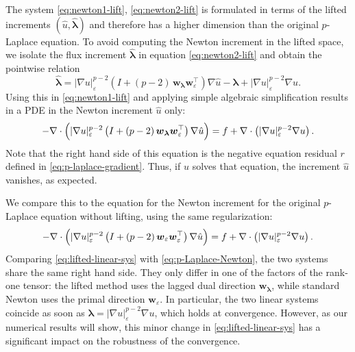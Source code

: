 \documentclass[11pt,pdflatex,sn-mathphys-num]{sn-jnl}
\theoremstyle{thmstyleone}%
\theoremstyle{thmstyletwo}%
\theoremstyle{thmstylethree}%
\newcommand{\bs}[1]{\ensuremath{\boldsymbol{#1}}}
\begin{document}
The system \eqref{eq:newton1-lift}, \eqref{eq:newton2-lift} is formulated in terms of the lifted increments $(\hat u, \hat{\bs\lambda})$ and therefore has a higher dimension than the original $p$-Laplace equation. To avoid computing the Newton increment in the lifted space, we isolate the flux increment $\hat{\bs\lambda}$ in equation \eqref{eq:newton2-lift} and obtain the pointwise relation
\begin{equation}\label{eq:lambda-update}
  \hat{\bs \lambda} = |\nabla u|_\varepsilon^{p-2} \left(I + (p-2)\,\bs w_{\bs\lambda}\bs w_\varepsilon^\top\right)  \nabla \hat u - \bs \lambda + |\nabla u|_\varepsilon^{p-2} \nabla u.
\end{equation}
Using this in \eqref{eq:newton1-lift} and applying simple algebraic simplification results in a PDE in the Newton increment $\hat u$ only:
\begin{align}\label{eq:lifted-linear-sys}
        -\nabla \cdot \Bigl(|\nabla u|_\varepsilon^{p-2}\left(I + (p-2)\,\bs w_{\bs\lambda}\bs w_\varepsilon^\top\right)  \nabla \hat u \Bigr) = f + \nabla \cdot \left( |\nabla u|_\varepsilon^{p-2} \nabla u\right).
\end{align}
Note that the right hand side of this equation is the negative equation residual $r$ defined in \eqref{eq:p-laplace-gradient}.
Thus, if $u$ solves that equation, the increment $\hat u$ vanishes, as expected.

We compare this to the equation for the Newton increment for the original $p$-Laplace equation without lifting, using the same regularization:
    \begin{align}\label{eq:p-Laplace-Newton}
        -\nabla \cdot \Bigl(|\nabla u|_\varepsilon^{p-2}\left(I + (p-2)\,\bs w_\varepsilon\bs w_\varepsilon^\top\right)  \nabla \hat u \Bigr) = f + \nabla \cdot \left( |\nabla u|_\varepsilon^{p-2} \nabla u\right).
    \end{align}
Comparing \eqref{eq:lifted-linear-sys} with \eqref{eq:p-Laplace-Newton}, the two systems share the same right hand side. They only differ in one of the factors of the rank-one tensor: the lifted method uses the lagged dual direction $\bs w_{\bs\lambda}$, while standard Newton uses the primal direction $\bs w_\varepsilon$. In particular, the two linear systems coincide as soon as $\bs\lambda = |\nabla u|_\varepsilon^{p-2}\nabla u$, which holds at convergence. However, as our numerical results will show, this minor change in \eqref{eq:lifted-linear-sys} has a significant impact on the robustness of the convergence.
\end{document}

